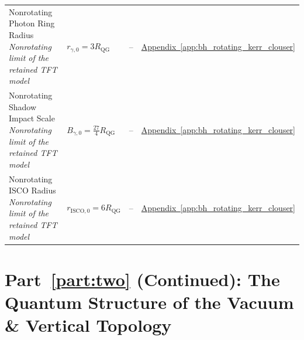 \begin{longtable}{@{} p{4.5cm} p{6cm} c p{4cm} @{}}
{\raggedright Nonrotating Photon Ring Radius \newline \textit{Nonrotating limit of the retained TFT model}\par} & {\raggedright $r_{\gamma,0} = 3R_{\mathrm{QG}}$\par} & -- & {\raggedright \hyperref[app:bh_rotating_kerr_clouser]{Appendix~\ref*{app:bh_rotating_kerr_clouser}}\par} \\

{\raggedright Nonrotating Shadow Impact Scale \newline \textit{Nonrotating limit of the retained TFT model}\par} & {\raggedright $B_{\gamma,0} = \frac{27}{4}R_{\mathrm{QG}}$\par} & -- & {\raggedright \hyperref[app:bh_rotating_kerr_clouser]{Appendix~\ref*{app:bh_rotating_kerr_clouser}}\par} \\

{\raggedright Nonrotating ISCO Radius \newline \textit{Nonrotating limit of the retained TFT model}\par} & {\raggedright $r_{\mathrm{ISCO},0} = 6R_{\mathrm{QG}}$\par} & -- & {\raggedright \hyperref[app:bh_rotating_kerr_clouser]{Appendix~\ref*{app:bh_rotating_kerr_clouser}}\par} \\

\bottomrule
\end{longtable}

\par\ifdim\dimexpr\pagegoal-\pagetotal\relax<12\baselineskip\newpage\fi
\section*{Part~\ref{part:two} (Continued): The Quantum Structure of the Vacuum \& Vertical Topology}

